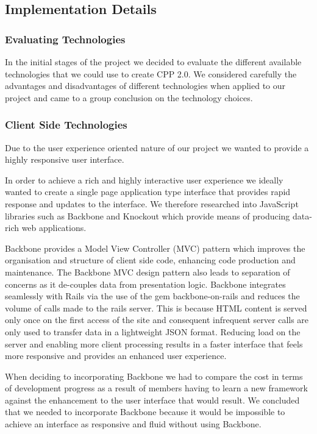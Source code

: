 \subsection{Implementation Details}

	\subsubsection{Evaluating Technologies}
		In the initial stages of the project we decided to evaluate the different available technologies that we could use to create CPP 2.0. We considered carefully the advantages and disadvantages of different technologies when applied to our project and came to a group conclusion on the technology choices.

	\subsubsection{Client Side Technologies}
		Due to the user experience oriented nature of our project we wanted to provide a highly responsive user interface. 

		In order to achieve a rich and highly interactive user experience we ideally wanted to create a single page application type interface that provides rapid response and updates to the interface. We therefore researched into JavaScript libraries such as Backbone and Knockout which provide means of producing data-rich web applications.  
		
		Backbone provides a Model View Controller (MVC) pattern which improves the organisation and structure of client side code, enhancing code production and maintenance. The Backbone MVC design pattern also leads to separation of concerns as it de-couples data from presentation logic. Backbone integrates seamlessly with Rails via the use of the gem backbone-on-rails and reduces the volume of calls made to the rails server. This is because HTML content is served only once on the first access of the site and consequent infrequent server calls are only used to transfer data in a lightweight JSON format. Reducing load on the server and enabling more client processing results in a faster interface that feels more responsive and provides an enhanced user experience.
		
		When deciding to incorporating Backbone we had to compare the cost in terms of development progress as a result of members having to learn a new framework against the enhancement to the user interface that would result. We concluded that we needed to incorporate Backbone because it would be impossible to achieve an interface as responsive and fluid without using Backbone.

